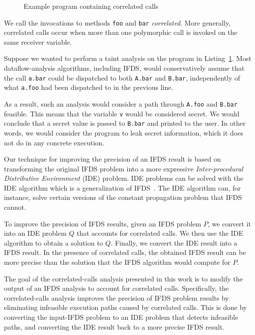 \begin{figure}
  \centering
  \begin{minipage}{\textwidth}
  \end{minipage}
  \caption{Example program containing correlated calls}
  \label{list:ccexample}
\end{figure}

We call the invocations to methods \verb'foo' and \verb'bar' \textit{correlated}.
More generally, correlated calls occur when more than one polymorphic call is invoked on the same receiver variable.

Suppose we wanted to perform a taint analysis on the program in Listing~\ref{list:ccexample}.
Most dataflow-analysis algorithms, including IFDS, would conservatively assume that the call \verb'a.bar' could be dispatched to both \verb'A.bar' and \verb'B.bar', independently of what \verb'a.foo' had been dispatched to in the previous line.

As a result, 
such an analysis would consider a path through \verb'A.foo' and \verb'B.bar' feasible. This means that the variable \verb'v' would be considered secret. We would conclude that a secret value is passed to \verb'B.bar' and printed to the user. In other words, we would consider the program to leak secret information, which it does not do in any concrete execution.

Our technique for improving the precision of an IFDS result is based on transforming the original IFDS problem into a more expressive \textit{Inter-procedural Distributive Environment} (IDE) problem. IDE problems can be solved with the IDE algorithm which is a generalization of IFDS~\cite{sagiv1996precise}. The IDE algorithm can, for instance, solve certain versions of the constant propagation problem that IFDS cannot.

To improve the precision of IFDS results, given an IFDS problem $P$, we convert it into an IDE problem $Q$ that accounts for correlated calls. We then use the IDE algorithm to obtain a solution to $Q$. Finally, we convert the IDE result into a IFDS result. In the presence of correlated calls, the obtained IFDS result can be more precise than the solution that the IFDS algorithm would compute for $P$.

The goal of the correlated-calls analysis presented in this work is to modify the output of an IFDS analysis to account for correlated calls. Specifically, the correlated-calls analysis improves the precision of IFDS problem results by eliminating infeasible execution paths caused by correlated calls. This is done by converting the input-IFDS problem to an IDE problem that detects infeasible paths, and converting the IDE result back to a more precise IFDS result.

